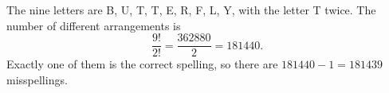 The nine letters are B, U, T, T, E, R, F, L, Y, with the letter T twice. The number of different arrangements is
\[\dfrac{9!}{2!}=\dfrac{362880}{2}=181440.\]
Exactly one of them is the correct spelling, so there are $181440-1=\boxed{181439}$ misspellings.
